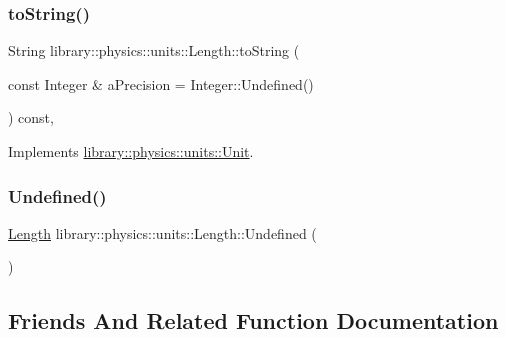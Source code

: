 \subsubsection{\texorpdfstring{to\+String()}{toString()}}
{\footnotesize\ttfamily String library\+::physics\+::units\+::\+Length\+::to\+String (\begin{DoxyParamCaption}\item[{const Integer \&}]{a\+Precision = {\ttfamily Integer\+:\+:Undefined()} }\end{DoxyParamCaption}) const\hspace{0.3cm}{\ttfamily [override]}, {\ttfamily [virtual]}}



Implements \hyperlink{classlibrary_1_1physics_1_1units_1_1_unit_aac05cb6ed1ea7c18c233a3381c81caf8}{library\+::physics\+::units\+::\+Unit}.

\mbox{\label{classlibrary_1_1physics_1_1units_1_1_length_a5dc80bc442d377701cf052c5bd27bef6}} 
\subsubsection{\texorpdfstring{Undefined()}{Undefined()}}
{\footnotesize\ttfamily \hyperlink{classlibrary_1_1physics_1_1units_1_1_length}{Length} library\+::physics\+::units\+::\+Length\+::\+Undefined (\begin{DoxyParamCaption}{ }\end{DoxyParamCaption})\hspace{0.3cm}{\ttfamily [static]}}



\subsection{Friends And Related Function Documentation}
\mbox{\label{classlibrary_1_1physics_1_1units_1_1_length_a72059ec2f1e930a0e75a3a808e434363}} 
